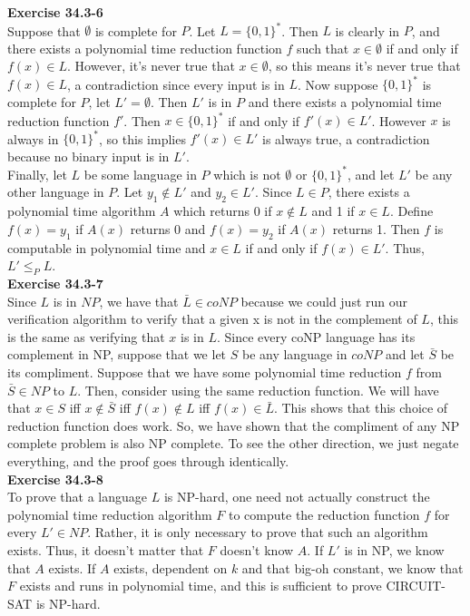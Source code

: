 \documentclass{article}
\begin{document}
\noindent\textbf{Exercise 34.3-6}\\

Suppose that $\emptyset$ is complete for $P$.  Let $L= \{0,1\}^*$.  Then $L$ is clearly in $P$, and there exists a polynomial time reduction function $f$ such that $x \in \emptyset$ if and only if $f(x) \in L$.  However, it's never true that $x \in \emptyset$, so this means it's never true that $f(x) \in L$, a contradiction since every input is in $L$.  Now suppose $\{0,1\}^*$ is complete for $P$, let $L' = \emptyset$.  Then $L'$ is in $P$ and there exists a polynomial time reduction function $f'$.  Then $x \in \{0,1\}^*$ if and only if $f'(x) \in L'$.  However $x$ is always in $\{0,1\}^*$, so this implies $f'(x) \in L'$ is always true, a contradiction because no binary input is in $L'$.\\

Finally, let $L$ be some language in $P$ which is not $\emptyset$ or $\{0,1\}^*$, and let $L'$ be any other language in $P$.  Let $y_1 \notin L'$ and $y_2 \in L'$.  Since $L \in P$, there exists a polynomial time algorithm $A$ which returns $0$ if $x \notin L$ and 1 if $x \in L$.  Define $f(x) = y_1$ if $A(x)$ returns 0 and $f(x) = y_2$ if $A(x)$ returns 1.  Then $f$ is computable in polynomial time and $x \in L$ if and only if $f(x) \in L'$.  Thus, $L' \leq_P L$. \\

\noindent\textbf{Exercise 34.3-7}\\

Since $L$ is in $NP$, we have that $\bar{L}\in coNP$ because we could just run our verification algorithm to verify that a given x is not in the complement of $L$, this is the same as verifying that $x$ is in $L$. Since every coNP language has its complement in NP, suppose that we let $S$ be any language in $coNP$ and let $\bar{S}$ be its compliment. Suppose that we have some polynomial time reduction $f$ from $\bar{S}\in NP$ to $L$. Then, consider using the same reduction function. We will have that $x\in S$ iff $x\not\in \bar{S}$ iff $f(x)\not\in L$ iff $f(x)\in \bar{L}$. This shows that this choice of reduction function does work. So, we have shown that the compliment of any NP complete problem is also NP complete. To see the other direction, we just negate everything, and the proof goes through identically.\\

\noindent\textbf{Exercise 34.3-8}\\

To prove that a language $L$ is NP-hard, one need not actually construct the polynomial time reduction algorithm $F$ to compute the reduction function $f$ for every $L' \in NP$.  Rather, it is only necessary to prove that such an algorithm exists.  Thus, it doesn't matter that $F$ doesn't know $A$.  If $L'$ is in NP, we know that $A$ exists.  If $A$ exists, dependent on $k$ and that big-oh constant, we know that $F$ exists and runs in polynomial time, and this is sufficient to prove CIRCUIT-SAT is NP-hard. \\
\end{document}
